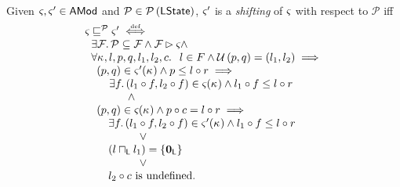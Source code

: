 \begin{definition} Given $\varsigma_{}, \varsigma_{}' \in \textsf{AMod}$ and $\mathcal{P} \in \mathcal{P}\left(\textsf{LState} \right)$, $\varsigma_{}'$ is a \emph{shifting} of $\varsigma_{}$ with respect to $\mathcal{P}$ iff
%
\[
\begin{array}{l}
	\varsigma_{} \sqsubseteq^{\mathcal{P}}  \varsigma_{}' \mathrel{\stackrel{\smash{\scriptscriptstyle{\mathrm{def}}}}{\iff}} \\
	\hspace*{0.2cm} \exists \mathcal{F}_{}.\, \mathcal{P} \subseteq \mathcal{F}_{} \land \mathcal{F}_{} \rhd \varsigma_{} \land\\
	\hspace*{0.2cm}\forall \kappa_{}, l, p, q, l_1, l_2, c.\,\;\; l \in F \land \mathcal{U}\left(p, q\right) = (l_1, l_2) \implies\\
	\hspace*{0.2cm}
	\begin{array}{l}
		(p, q) \in \varsigma_{}'(\kappa_{}) 
		\land p \leq l \circ r \implies \\
		\hspace*{0.4cm}\exists f.\, (l_1 \circ f, l_2 \circ f) \in \varsigma_{}(\kappa_{}) \land l_1 \circ f \leq l \circ r \\

		\hspace*{1cm} \land\\
		
		(p, q) \in \varsigma_{}(\kappa_{})
		\land p \circ c = l \circ r \implies \\
		\hspace*{0.2cm}
		\begin{array}{l}
			\exists f.\, (l_1 \circ f, l_2 \circ f) \in \varsigma_{}'(\kappa_{}) \land l_1 \circ f \leq l \circ r \\
			\hspace*{1cm} \lor\\
			\left( l \sqcap_{\textsf{L}} l_1 \right) = \left\{ \mathbf{0}_{\textsf{L}} \right\}\\
			\hspace*{1cm} \lor\\
			l_2 \circ c \text{ is undefined}.
		\end{array}


\end{array}
\end{array}\]
\end{definition}
